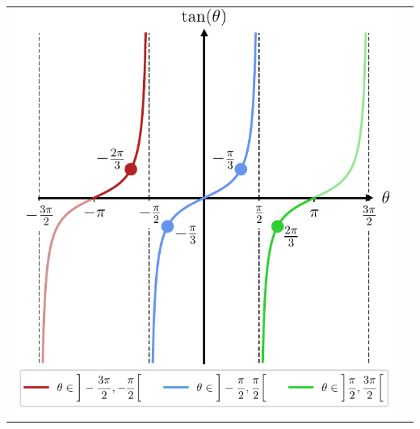 \documentclass[../../main/main.tex]{subfiles}
\begin{document}
\begin{tcb*}[breakable]
\begin{center}
\begin{tabularx}{\linewidth}{YY}
{					{\includegraphics[width=0.85\linewidth]{fig_tan_prof}}
				}%
				 &
\end{tabularx}
\end{center}
\end{tcb*}
\end{document}
